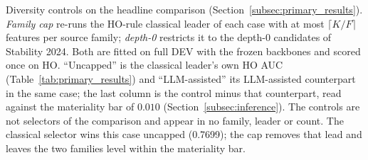 \documentclass[final,5p,twocolumn]{elsarticle}
\newcommand{\Kfeat}{K}
\providecommand{\DIFdeltex}[1]{{\protect\color{red} \scriptsize #1}} %
\providecommand{\DIFdelFL}[1]{\DIFdel{#1}} %
\providecommand{\DIFdel}[1]{\texorpdfstring{\DIFdeltex{#1}}{}} %
\begin{document}
{%
\DIFdelFL{Diversity controls on the headline comparison (Section~\ref{subsec:primary_results}). \emph{Family cap} re-runs the HO-rule classical leader of each case with at most $\lceil \Kfeat/F\rceil$ features per source family; \emph{depth-0} restricts it to the depth-0 candidates of Stability 2024. Both are fitted on full DEV with the frozen backbones and scored once on HO. ``Uncapped'' is the classical leader's own HO AUC (Table~\ref{tab:primary_results}) and ``LLM-assisted'' its LLM-assisted counterpart in the same case; the last column is the control minus that counterpart, read against the materiality bar of $0.010$ (Section~\ref{subsec:inference}). The controls are not selectors of the comparison and appear in no family, leader or count.}}
\DIFdelFL{The classical selector wins this case uncapped (0.7699); the cap removes that lead and leaves the two families level within the materiality bar. }%
\end{document}
